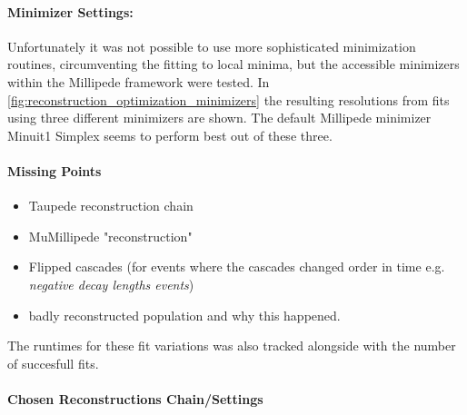 
\paragraph{Minimizer Settings:}

Unfortunately it was not possible to use more sophisticated minimization routines, circumventing the fitting to local minima, but the accessible minimizers within the Millipede framework were tested. In \cref{fig:reconstruction_optimization_minimizers} the resulting resolutions from fits using three different minimizers are shown. The default Millipede minimizer Minuit1 Simplex seems to perform best out of these three.


\paragraph{Missing Points}
\begin{itemize}
    \item Taupede reconstruction chain
    \item MuMillipede "reconstruction"
    \item Flipped cascades (for events where the cascades changed order in time e.g. \textit{negative decay lengths events})
    \item badly reconstructed population and why this happened.
\end{itemize}

The runtimes for these fit variations was also tracked alongside with the number of succesfull fits.

\paragraph{Chosen Reconstructions Chain/Settings}

